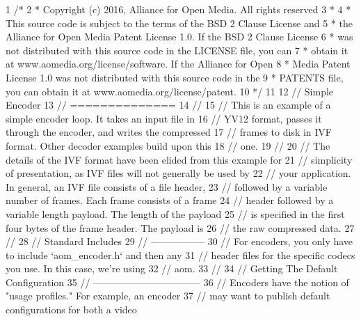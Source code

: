 \begin{DoxyCodeInclude}
1 \textcolor{comment}{/*}
2 \textcolor{comment}{ * Copyright (c) 2016, Alliance for Open Media. All rights reserved}
3 \textcolor{comment}{ *}
4 \textcolor{comment}{ * This source code is subject to the terms of the BSD 2 Clause License and}
5 \textcolor{comment}{ * the Alliance for Open Media Patent License 1.0. If the BSD 2 Clause License}
6 \textcolor{comment}{ * was not distributed with this source code in the LICENSE file, you can}
7 \textcolor{comment}{ * obtain it at www.aomedia.org/license/software. If the Alliance for Open}
8 \textcolor{comment}{ * Media Patent License 1.0 was not distributed with this source code in the}
9 \textcolor{comment}{ * PATENTS file, you can obtain it at www.aomedia.org/license/patent.}
10 \textcolor{comment}{ */}
11 
12 \textcolor{comment}{// Simple Encoder}
13 \textcolor{comment}{// ==============}
14 \textcolor{comment}{//}
15 \textcolor{comment}{// This is an example of a simple encoder loop. It takes an input file in}
16 \textcolor{comment}{// YV12 format, passes it through the encoder, and writes the compressed}
17 \textcolor{comment}{// frames to disk in IVF format. Other decoder examples build upon this}
18 \textcolor{comment}{// one.}
19 \textcolor{comment}{//}
20 \textcolor{comment}{// The details of the IVF format have been elided from this example for}
21 \textcolor{comment}{// simplicity of presentation, as IVF files will not generally be used by}
22 \textcolor{comment}{// your application. In general, an IVF file consists of a file header,}
23 \textcolor{comment}{// followed by a variable number of frames. Each frame consists of a frame}
24 \textcolor{comment}{// header followed by a variable length payload. The length of the payload}
25 \textcolor{comment}{// is specified in the first four bytes of the frame header. The payload is}
26 \textcolor{comment}{// the raw compressed data.}
27 \textcolor{comment}{//}
28 \textcolor{comment}{// Standard Includes}
29 \textcolor{comment}{// -----------------}
30 \textcolor{comment}{// For encoders, you only have to include `aom\_encoder.h` and then any}
31 \textcolor{comment}{// header files for the specific codecs you use. In this case, we're using}
32 \textcolor{comment}{// aom.}
33 \textcolor{comment}{//}
34 \textcolor{comment}{// Getting The Default Configuration}
35 \textcolor{comment}{// ---------------------------------}
36 \textcolor{comment}{// Encoders have the notion of "usage profiles." For example, an encoder}
37 \textcolor{comment}{// may want to publish default configurations for both a video}

\end{DoxyCodeInclude}
